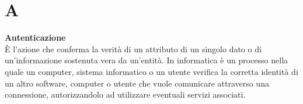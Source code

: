 \section{A}
\textbf{Autenticazione}\\
È l’azione che conferma la verità di un attributo di un singolo dato o di un’informazione sostenuta vera da un’entità. In informatica è un processo nella quale un computer, sistema informatico o un utente verifica la corretta identità di un altro software, computer o utente che vuole comunicare attraverso una connessione, autorizzandolo  ad utilizzare eventuali servizi associati.

\clearpage